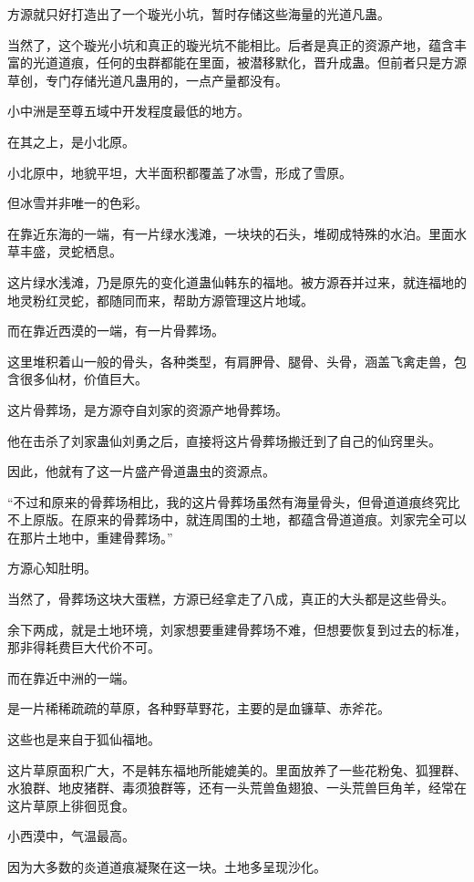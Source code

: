 \begin{this_body}
方源就只好打造出了一个璇光小坑，暂时存储这些海量的光道凡蛊。

当然了，这个璇光小坑和真正的璇光坑不能相比。后者是真正的资源产地，蕴含丰富的光道道痕，任何的虫群都能在里面，被潜移默化，晋升成蛊。但前者只是方源草创，专门存储光道凡蛊用的，一点产量都没有。

小中洲是至尊五域中开发程度最低的地方。

在其之上，是小北原。

小北原中，地貌平坦，大半面积都覆盖了冰雪，形成了雪原。

但冰雪并非唯一的色彩。

在靠近东海的一端，有一片绿水浅滩，一块块的石头，堆砌成特殊的水泊。里面水草丰盛，灵蛇栖息。

这片绿水浅滩，乃是原先的变化道蛊仙韩东的福地。被方源吞并过来，就连福地的地灵粉红灵蛇，都随同而来，帮助方源管理这片地域。

而在靠近西漠的一端，有一片骨葬场。

这里堆积着山一般的骨头，各种类型，有肩胛骨、腿骨、头骨，涵盖飞禽走兽，包含很多仙材，价值巨大。

这片骨葬场，是方源夺自刘家的资源产地骨葬场。

他在击杀了刘家蛊仙刘勇之后，直接将这片骨葬场搬迁到了自己的仙窍里头。

因此，他就有了这一片盛产骨道蛊虫的资源点。

“不过和原来的骨葬场相比，我的这片骨葬场虽然有海量骨头，但骨道道痕终究比不上原版。在原来的骨葬场中，就连周围的土地，都蕴含骨道道痕。刘家完全可以在那片土地中，重建骨葬场。”

方源心知肚明。

当然了，骨葬场这块大蛋糕，方源已经拿走了八成，真正的大头都是这些骨头。

余下两成，就是土地环境，刘家想要重建骨葬场不难，但想要恢复到过去的标准，那非得耗费巨大代价不可。

而在靠近中洲的一端。

是一片稀稀疏疏的草原，各种野草野花，主要的是血镰草、赤斧花。

这些也是来自于狐仙福地。

这片草原面积广大，不是韩东福地所能媲美的。里面放养了一些花粉兔、狐狸群、水狼群、地皮猪群、毒须狼群等，还有一头荒兽鱼翅狼、一头荒兽巨角羊，经常在这片草原上徘徊觅食。

小西漠中，气温最高。

因为大多数的炎道道痕凝聚在这一块。土地多呈现沙化。


\end{this_body}
